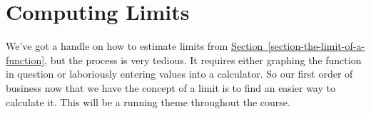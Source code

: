 \documentclass[10pt,]{book}
\numberwithin{equation}{section}
\begin{document}
\section[{Computing Limits}]{Computing Limits}\label{section-computing-limits}
\begin{introduction}{}%
\hypertarget{p-19}{}%
We've got a handle on how to estimate limits from \hyperref[section-the-limit-of-a-function]{Section~\ref{section-the-limit-of-a-function}}, but the process is very tedious. It requires either graphing the function in question or laboriously entering values into a calculator. So our first order of business now that we have the concept of a limit is to find an easier way to calculate it. This will be a running theme throughout the course.%
\end{introduction}%
%
%
\typeout{************************************************}
\typeout{************************************************}
%
\end{document}
